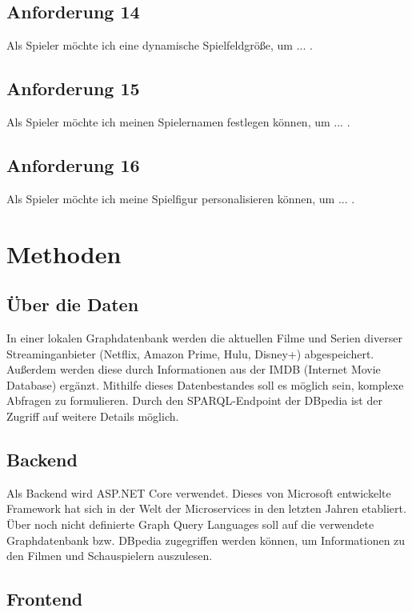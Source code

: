 \documentclass[conference]{IEEEtran}
\begin{document}
\subsection{Anforderung 14}
Als Spieler möchte ich eine dynamische Spielfeldgröße, um ... .

\subsection{Anforderung 15}
Als Spieler möchte ich meinen Spielernamen festlegen können, um ... .

\subsection{Anforderung 16}
Als Spieler möchte ich meine Spielfigur personalisieren können, um ... .

\section{Methoden}

\subsection*{Über die Daten}

In einer lokalen Graphdatenbank werden die aktuellen Filme und Serien diverser Streaminganbieter (Netflix, Amazon Prime, Hulu, Disney+) abgespeichert. Außerdem werden diese durch Informationen aus der IMDB (Internet Movie Database) ergänzt. Mithilfe dieses Datenbestandes soll es möglich sein, komplexe Abfragen zu formulieren. Durch den SPARQL-Endpoint der DBpedia ist der Zugriff auf weitere Details möglich.

\subsection*{Backend}

Als Backend wird ASP.NET Core verwendet. Dieses von Microsoft entwickelte Framework hat sich in der Welt der Microservices in den letzten Jahren etabliert. Über noch nicht definierte Graph Query Languages soll auf die verwendete Graphdatenbank bzw. DBpedia zugegriffen werden können, um Informationen zu den Filmen und Schauspielern auszulesen.

\subsection*{Frontend}
\end{document}
